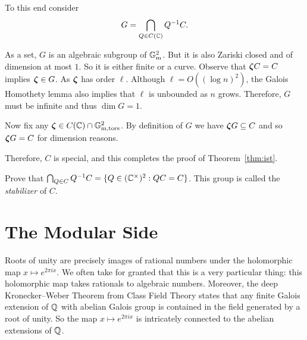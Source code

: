 To this end consider
\begin{equation*}
  G = \bigcap_{Q\in C({\mathbb{C}})} Q^{-1} C.
\end{equation*}

As a set, $G$ is an algebraic subgroup of ${\mathbb{G}}_{\mathrm{m}}^2$. But it is also Zariski
closed and of dimension at most $1$. So it is either finite or a
curve. Observe that ${\boldsymbol{\zeta}} C = C$ implies ${\boldsymbol{\zeta}}\in G$. As
${\boldsymbol{\zeta}}$ has order $\ell$. Although $\ell = O((\log n)^2)$, the
Galois Homothety lemma also implies that $\ell$ is unbounded as $n$
grows.
Therefore, $G$ must be
infinite and thus $\dim G=1$.

Now fix any ${\boldsymbol{\zeta}}\in C({\mathbb{C}})\cap {\mathbb{G}}_{\mathrm{m,tors}}^2$. By definition
of $G$ we have ${\boldsymbol{\zeta}} G \subseteq C$ and so ${\boldsymbol{\zeta}} G = C$ for
dimension reasons. 

Therefore, $C$ is special, and this completes the proof of
Theorem~\ref{thm:ist}.

\begin{exercise}
  Prove that
  $\bigcap_{Q\in C} Q^{-1} C = \{Q\in ({\mathbb{C}}^\times)^2 : QC=C\}$.
  This group is called the \emph{stabilizer} of $C$.
\end{exercise}





\section{The Modular Side}

Roots of unity are precisely images of rational numbers under the
holomorphic map $x\mapsto e^{2\pi i x}$. We often take for granted
that this is a very particular thing: this holomorphic map takes
rationals to algebraic numbers. Moreover, the deep Kronecker--Weber
Theorem from Class Field Theory states that any finite Galois
extension of ${\mathbb{Q}}$ with abelian Galois group is contained in the field
generated by a root of unity. So the map $x\mapsto e^{2\pi i x}$ is
intricately connected to the abelian extensions of ${\mathbb{Q}}$.

